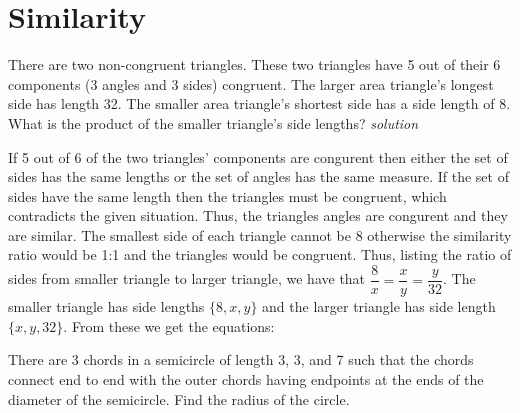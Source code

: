 \documentclass{amsbook}
\begin{document}
\chapter{Similarity}
\begin{Exercise}[title={Almost the same}, difficulty=2, label=9a1]
There are two non-congruent triangles. These two triangles have 5 out of their 6 components (3 angles and 3 sides) congruent. The larger area triangle's longest side has length 32. The smaller area triangle's shortest side has a side length of 8. What is the product of the smaller triangle's side lengths?
\hfill \emph{solution} 
\end{Exercise}

\begin{Answer}[ref={9a1}]
If 5 out of 6 of the two triangles' components are congurent then either the set of sides has the same lengths or the set of angles has the same measure. If the set of sides have the same length then the triangles must be congruent, which contradicts the given situation. Thus, the triangles angles are congurent and they are similar. The smallest side of each triangle cannot be 8 otherwise the similarity ratio would be 1:1 and the triangles would be congruent. Thus, listing the ratio of sides from smaller triangle to larger triangle, we have that $\dfrac{8}{x}=\dfrac{x}{y}=\dfrac{y}{32}$. The smaller triangle has side lengths $\{8,x,y\}$ and the larger triangle has side length $\{x,y,32\}$. From these we get the equations:

\end{Answer}

\begin{Exercise}[title={Triangles in a Semicircle}, difficulty=3, label=9a2]
There are 3 chords in a semicircle  of length 3, 3, and 7 such that the chords connect end to end with the outer chords having endpoints at the ends of the diameter of the semicircle. Find the radius of the circle. 
\end{Exercise}

\begin{Answer}[ref={9a2}]

\end{Answer}
\end{document}
